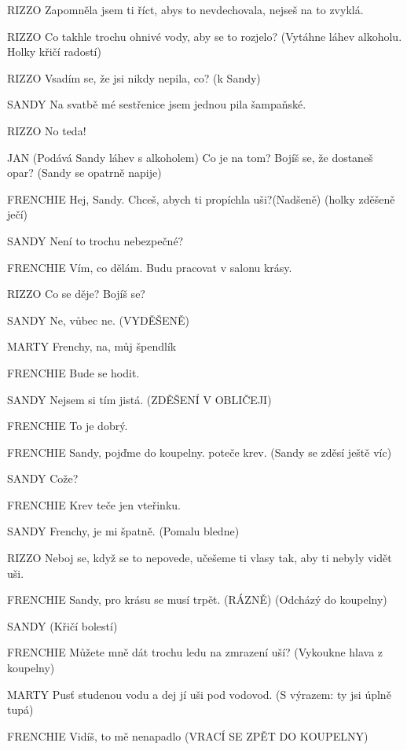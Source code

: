 RIZZO                Zapomněla jsem ti říct, abys to nevdechovala, nejseš na to zvyklá.

RIZZO                Co takhle trochu ohnivé vody, aby se to rozjelo? (Vytáhne                                 láhev alkoholu. Holky křičí radostí)

RIZZO                Vsadím se, že jsi nikdy nepila, co? (k Sandy)

SANDY                Na svatbě mé sestřenice jsem jednou pila šampaňské.

RIZZO                No teda!

JAN                (Podává Sandy láhev s alkoholem) Co je na tom? Bojíš se, že dostaneš                 opar? (Sandy se opatrně napije)

FRENCHIE        Hej, Sandy. Chceš, abych ti propíchla uši?(Nadšeně) (holky zděšeně ječí) 

SANDY        Není to trochu nebezpečné?

FRENCHIE        Vím, co dělám. Budu pracovat v salonu krásy.

RIZZO        Co se děje? Bojíš se?

SANDY        Ne, vůbec ne. (VYDĚŠENĚ)

MARTY        Frenchy, na, můj špendlík

FRENCHIE        Bude se hodit. 

SANDY        Nejsem si tím jistá. (ZDĚŠENÍ V OBLIČEJI)

FRENCHIE        To je dobrý. 

FRENCHIE        Sandy, pojďme do koupelny. poteče krev. (Sandy se zděsí ještě víc)

SANDY        Cože?

FRENCHIE        Krev teče jen vteřinku.

SANDY        Frenchy, je mi špatně. (Pomalu bledne)

RIZZO        Neboj se, když se to nepovede, učešeme ti vlasy tak, aby ti nebyly vidět         uši.

FRENCHIE        Sandy, pro krásu se musí trpět. (RÁZNĚ) (Odcházý do koupelny) 

SANDY        (Křičí bolestí)

FRENCHIE        Můžete mně dát trochu ledu na zmrazení uší? (Vykoukne hlava z                 koupelny)

MARTY        Pusť studenou vodu a dej jí uši pod vodovod. (S výrazem: ty jsi úplně         tupá) 

FRENCHIE        Vidíš, to mě nenapadlo (VRACÍ SE ZPĚT DO KOUPELNY)

